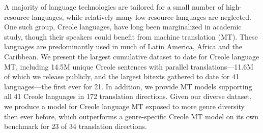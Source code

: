 A majority of language technologies are tailored for a small number of high-resource languages, while relatively many low-resource languages are neglected. One such group, Creole languages, have long been marginalized in academic study, though their speakers could benefit from machine translation (MT). These languages are predominantly used in much of Latin America, Africa and the Caribbean. We present the largest cumulative dataset to date for Creole language MT, including 14.5M unique Creole sentences with parallel translations---11.6M of which we release publicly, and the largest bitexts gathered to date for 41 languages---the first ever for 21. In addition, we provide MT models supporting all 41 Creole languages in 172 translation directions. Given our diverse dataset, we produce a model for Creole language MT exposed to more genre diversity then ever before, which outperforms a genre-specific Creole MT model on its own benchmark for 23 of 34 translation directions.